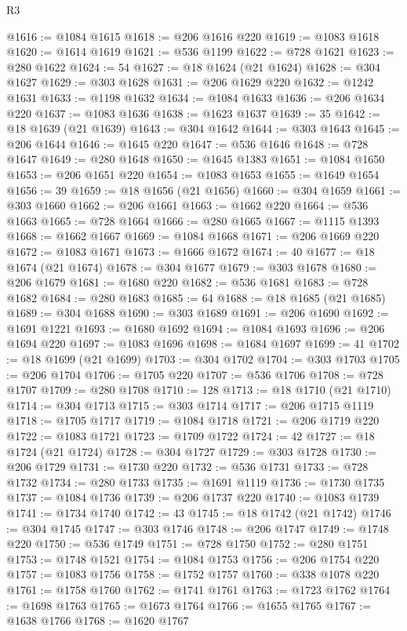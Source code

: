 \begin{lexlean}{R3}
\begin{coremodule}
@1616 := @1084 @1615
@1618 := @206 @1616 @220
@1619 := @1083 @1618
@1620 := @1614 @1619
@1621 := @536 @1199
@1622 := @728 @1621
@1623 := @280 @1622
@1624 := 54
@1627 := @18 @1624 (@21 @1624)
@1628 := @304 @1627
@1629 := @303 @1628
@1631 := @206 @1629 @220
@1632 := @1242 @1631
@1633 := @1198 @1632
@1634 := @1084 @1633
@1636 := @206 @1634 @220
@1637 := @1083 @1636
@1638 := @1623 @1637
@1639 := 35
@1642 := @18 @1639 (@21 @1639)
@1643 := @304 @1642
@1644 := @303 @1643
@1645 := @206 @1644
@1646 := @1645 @220
@1647 := @536 @1646
@1648 := @728 @1647
@1649 := @280 @1648
@1650 := @1645 @1383
@1651 := @1084 @1650
@1653 := @206 @1651 @220
@1654 := @1083 @1653
@1655 := @1649 @1654
@1656 := 39
@1659 := @18 @1656 (@21 @1656)
@1660 := @304 @1659
@1661 := @303 @1660
@1662 := @206 @1661
@1663 := @1662 @220
@1664 := @536 @1663
@1665 := @728 @1664
@1666 := @280 @1665
@1667 := @1115 @1393
@1668 := @1662 @1667
@1669 := @1084 @1668
@1671 := @206 @1669 @220
@1672 := @1083 @1671
@1673 := @1666 @1672
@1674 := 40
@1677 := @18 @1674 (@21 @1674)
@1678 := @304 @1677
@1679 := @303 @1678
@1680 := @206 @1679
@1681 := @1680 @220
@1682 := @536 @1681
@1683 := @728 @1682
@1684 := @280 @1683
@1685 := 64
@1688 := @18 @1685 (@21 @1685)
@1689 := @304 @1688
@1690 := @303 @1689
@1691 := @206 @1690
@1692 := @1691 @1221
@1693 := @1680 @1692
@1694 := @1084 @1693
@1696 := @206 @1694 @220
@1697 := @1083 @1696
@1698 := @1684 @1697
@1699 := 41
@1702 := @18 @1699 (@21 @1699)
@1703 := @304 @1702
@1704 := @303 @1703
@1705 := @206 @1704
@1706 := @1705 @220
@1707 := @536 @1706
@1708 := @728 @1707
@1709 := @280 @1708
@1710 := 128
@1713 := @18 @1710 (@21 @1710)
@1714 := @304 @1713
@1715 := @303 @1714
@1717 := @206 @1715 @1119
@1718 := @1705 @1717
@1719 := @1084 @1718
@1721 := @206 @1719 @220
@1722 := @1083 @1721
@1723 := @1709 @1722
@1724 := 42
@1727 := @18 @1724 (@21 @1724)
@1728 := @304 @1727
@1729 := @303 @1728
@1730 := @206 @1729
@1731 := @1730 @220
@1732 := @536 @1731
@1733 := @728 @1732
@1734 := @280 @1733
@1735 := @1691 @1119
@1736 := @1730 @1735
@1737 := @1084 @1736
@1739 := @206 @1737 @220
@1740 := @1083 @1739
@1741 := @1734 @1740
@1742 := 43
@1745 := @18 @1742 (@21 @1742)
@1746 := @304 @1745
@1747 := @303 @1746
@1748 := @206 @1747
@1749 := @1748 @220
@1750 := @536 @1749
@1751 := @728 @1750
@1752 := @280 @1751
@1753 := @1748 @1521
@1754 := @1084 @1753
@1756 := @206 @1754 @220
@1757 := @1083 @1756
@1758 := @1752 @1757
@1760 := @338 @1078 @220
@1761 := @1758 @1760
@1762 := @1741 @1761
@1763 := @1723 @1762
@1764 := @1698 @1763
@1765 := @1673 @1764
@1766 := @1655 @1765
@1767 := @1638 @1766
@1768 := @1620 @1767

\end{coremodule}
\end{lexlean}
